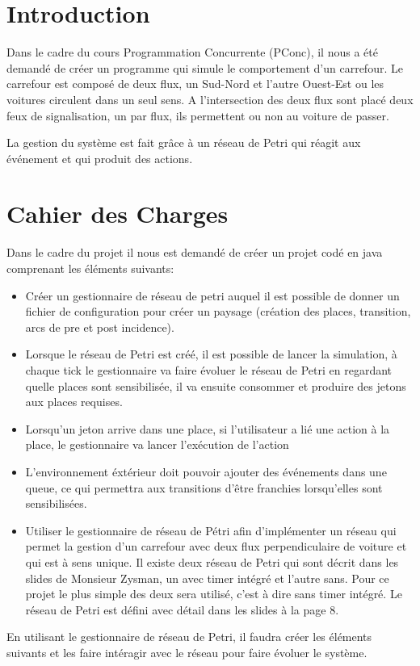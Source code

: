 \documentclass[11pt,a4paper, openany]{memoir}
\begin{document}





\chapter{Introduction}

Dans le cadre du cours Programmation Concurrente (PConc), il nous a été demandé de créer un programme qui simule le comportement d'un carrefour. Le carrefour est composé de deux flux, un Sud-Nord et l'autre Ouest-Est ou les voitures circulent dans un seul sens. A l'intersection des deux flux sont placé deux feux de signalisation, un par flux, ils permettent ou non au voiture de passer.\par
La gestion du système est fait grâce à un réseau de Petri qui réagit aux événement et qui produit des actions.

\chapter{Cahier des Charges}

Dans le cadre du projet il nous est demandé de créer un projet codé en java comprenant les éléments suivants:
\begin{itemize}
\item Créer un gestionnaire de réseau de petri auquel il est possible de donner un fichier de configuration pour créer un paysage (création des places, transition, arcs de pre et post incidence).
\item Lorsque le réseau de Petri est créé, il est possible de lancer la simulation, à chaque tick le gestionnaire va faire évoluer le réseau de Petri en regardant quelle places sont sensibilisée, il va ensuite consommer et produire des jetons aux places requises.
\item Lorsqu'un jeton arrive dans une place, si l'utilisateur a lié une action à la place, le gestionnaire va lancer l'exécution de l'action
\item L'environnement éxtérieur doit pouvoir ajouter des événements dans une queue, ce qui permettra aux transitions d'être franchies lorsqu'elles sont sensibilisées.
\item Utiliser le gestionnaire de réseau de Pétri afin d'implémenter un réseau qui permet la gestion d'un carrefour avec deux flux perpendiculaire de voiture et qui est à sens unique. Il existe deux réseau de Petri qui sont décrit dans les slides de Monsieur Zysman, un avec timer intégré et l'autre sans. Pour ce projet le plus simple des deux sera utilisé, c'est à dire sans timer intégré. Le réseau de Petri est défini avec détail dans les slides à la page 8.\\
\end{itemize}
En utilisant le gestionnaire de réseau de Petri, il faudra créer les éléments suivants et les faire intéragir avec le réseau pour faire évoluer le système.
\end{document}
